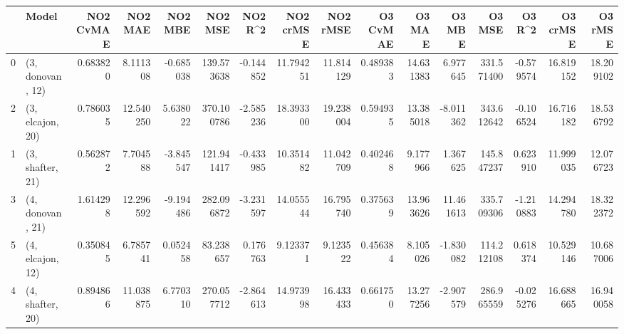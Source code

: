 \begin{tabular}{llrrrrrrrrrrrrrr}
\toprule
{} &             Model &  NO2 CvMAE &    NO2 MAE &   NO2 MBE &     NO2 MSE &   NO2 R\textasciicircum2 &  NO2 crMSE &   NO2 rMSE &  O3 CvMAE &     O3 MAE &     O3 MBE &      O3 MSE &    O3 R\textasciicircum2 &   O3 crMSE &    O3 rMSE \\
\midrule
0 &  (3, donovan, 12) &   0.683820 &   8.111308 & -0.685038 &  139.573638 & -0.144852 &  11.794251 &  11.814129 &  0.489383 &  14.631383 &   6.977645 &  331.571400 & -0.579574 &  16.819152 &  18.209102 \\
2 &  (3, elcajon, 20) &   0.786035 &  12.540250 &  5.638022 &  370.100786 & -2.585236 &  18.393300 &  19.238004 &  0.594935 &  13.385018 &  -8.011362 &  343.612642 & -0.106524 &  16.716182 &  18.536792 \\
1 &  (3, shafter, 21) &   0.562872 &   7.704588 & -3.845547 &  121.941417 & -0.433985 &  10.351482 &  11.042709 &  0.402468 &   9.177966 &   1.367625 &  145.847237 &  0.623910 &  11.999035 &  12.076723 \\
3 &  (4, donovan, 21) &   1.614298 &  12.296592 & -9.194486 &  282.096872 & -3.231597 &  14.055544 &  16.795740 &  0.375639 &  13.963626 &  11.461613 &  335.709306 & -1.210883 &  14.294780 &  18.322372 \\
5 &  (4, elcajon, 12) &   0.350845 &   6.785741 &  0.052458 &   83.238657 &  0.176763 &   9.123371 &   9.123522 &  0.456384 &   8.105026 &  -1.830082 &  114.212108 &  0.618374 &  10.529146 &  10.687006 \\
4 &  (4, shafter, 20) &   0.894866 &  11.038875 &  6.770310 &  270.057712 & -2.864613 &  14.973998 &  16.433433 &  0.661750 &  13.277256 &  -2.907579 &  286.965559 & -0.025276 &  16.688665 &  16.940058 \\
\bottomrule
\end{tabular}
